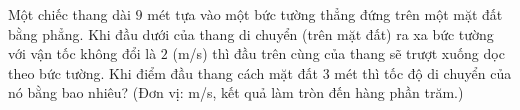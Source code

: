 \begin{ex}
Một chiếc thang dài $9$ mét tựa vào một bức tường thẳng đứng trên một mặt đất bằng phẳng. Khi đầu dưới của thang di chuyển (trên mặt đất) ra xa bức tường với vận tốc không đổi là $2$ (m/s) thì đầu trên cùng của thang sẽ trượt xuống dọc theo bức tường. Khi điểm đầu thang cách mặt đất $3$ mét thì tốc độ di chuyển của nó bằng bao nhiêu? (Đơn vị: m/s, kết quả làm tròn đến hàng phần trăm.)
\end{ex}

